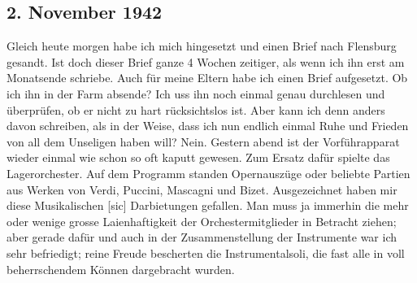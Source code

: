 \subsection{2. November 1942}

Gleich heute morgen habe ich mich hingesetzt und einen Brief nach Flensburg gesandt.
Ist doch dieser Brief ganze 4 Wochen zeitiger, als wenn ich ihn erst am Monatsende schriebe.
Auch f\"{u}r meine Eltern habe ich einen Brief aufgesetzt.
Ob ich ihn in der Farm absende?
Ich uss ihn noch einmal genau durchlesen und \"{u}berpr\"{u}fen, ob er nicht zu hart r\"{u}cksichtslos ist.
Aber kann ich denn anders davon schreiben, als in der Weise, dass ich nun endlich einmal Ruhe und Frieden von all dem Unseligen haben will?
Nein.
Gestern abend ist der Vorf\"{u}hrapparat wieder einmal wie schon so oft kaputt gewesen.
Zum Ersatz daf\"{u}r spielte das Lagerorchester.
Auf dem Programm standen Opernausz\"{u}ge oder beliebte Partien aus Werken von Verdi, Puccini, Mascagni und Bizet.
Ausgezeichnet haben mir diese Musikalischen{\color{red} [sic] } Darbietungen gefallen.
Man muss ja immerhin die mehr oder wenige grosse Laienhaftigkeit der Orchestermitglieder in Betracht ziehen; aber gerade daf\"{u}r und auch in der Zusammenstellung der Instrumente war ich sehr befriedigt; reine Freude bescherten die Instrumentalsoli, die fast alle in voll beherrschendem K\"{o}nnen dargebracht wurden.

\clearpage
